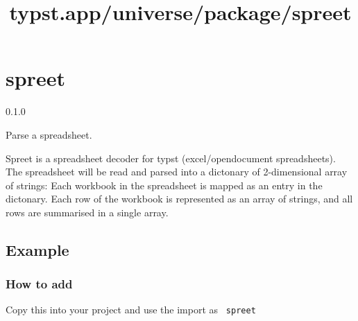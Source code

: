 \title{typst.app/universe/package/spreet}

\label{banner}
\section{spreet}\label{spreet}

{ 0.1.0 }

Parse a spreadsheet.

\label{readme}
Spreet is a spreadsheet decoder for typst (excel/opendocument
spreadsheets). The spreadsheet will be read and parsed into a dictonary
of 2-dimensional array of strings: Each workbook in the spreadsheet is
mapped as an entry in the dictonary. Each row of the workbook is
represented as an array of strings, and all rows are summarised in a
single array.

\subsection{Example}\label{example}

\begin{Shaded}
\begin{Highlighting}[]



\NormalTok{/**}
\NormalTok{(}
\NormalTok{  ),}
\NormalTok{  )}
\NormalTok{)}
\NormalTok{**/}
\end{Highlighting}
\end{Shaded}

\subsubsection{How to add}\label{how-to-add}

Copy this into your project and use the import as \texttt{\ spreet\ }


